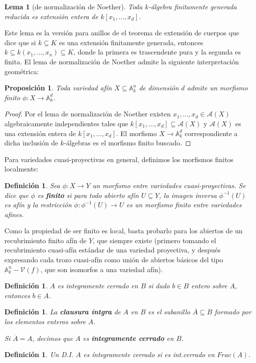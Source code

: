 \documentclass[a4paper,10pt]{book}
\newtheorem{lem}[thm]{Lema}
\newtheorem{prop}[thm]{Proposición}
\newtheorem{defn}[thm]{Definición}
\newcommand{\AAA}{\mathbb A}
\newcommand{\Ank}{\AAA^n_k}
\newcommand{\calA}{{\mathcal A}}
\newcommand{\VV}{{\mathcal V}}
\begin{document}
\begin{lem}[de normalización de Noether] Toda $k$-álgebra finitamente generada reducida es extensión entera de $k[x_1,\dots,x_d]$. 
\end{lem}

Este lema es la versión para anillos de el teorema de extensión de cuerpos que dice que si $k\subseteq K$ es una extensión finitamente generada, entonces $k\subseteq k(x_1,\dots,x_n)\subseteq K$, donde la primera es trascendente pura y la segunda es finita.
El lema de normalización de Noether admite la siguiente interpretación geométrica:

\begin{prop}
 Toda variedad afín $X\subseteq\Ank$ de dimensión $d$ admite un morfismo finito $\phi:X\to\AAA^d_k$.
\end{prop}

\begin{proof}
 Por el lema de normalización de Noether \cite[4.6]{reid} existen $x_1,\ldots,x_d\in\calA(X)$ algebraicamente independientes tales que $k[x_1,\ldots,x_d]\subseteq\calA(X)$ y $\calA(X)$ es una extensión entera de $k[x_1,\ldots,x_d]$. El morfismo $X\to\AAA^d_k$ correspondiente a dicha inclusión de $k$-álgebras es el morfismo finito buscado.
\end{proof}


Para variedades cuasi-proyectivas en general, definimos los morfismos finitos localmente:

\begin{defn}
 Sea $\phi:X\to Y$ un morfismo entre variedades cuasi-proyectivas. Se dice que $\phi$ es {\bf finito} si para todo abierto afín $U\subseteq Y$, la imagen inversa $\phi^{-1}(U)$ es afín y la restricción $\phi:\phi^{-1}(U)\to U$ es un morfismo finito entre variedades afines. 
\end{defn}

Como la propiedad de ser finito es local, basta probarlo para los abiertos de un recubrimiento finito afín de $Y$, que siempre existe (primero tomando el recubrimiento cuasi-afín estándar de una variedad proyectiva, y después expresando cada trozo cuasi-afín como unión de abiertos básicos del tipo $\Ank-\VV(f)$, que son isomorfos a una variedad afín). 

\begin{defn}
$A$ es integramente cerrado en $B$ si dado $b \in B$ entero sobre $A$, entonces $b \in A$.
\end{defn}

\begin{defn}
La \textbf{clausura íntgra} de $A$ en $B$ es el subanillo $\overline{A} \subseteq B$ formado por los elementos enteros sobre $A$.

Si $\overline{A} = A$, decimos que $A$ es \textbf{íntegramente cerrado} en $B$.
\end{defn}
\begin{defn}
Un D.I. $A$ es íntegramente cerrado si es int.cerrado en $Frac(A)$.
\end{defn}
\end{document}
